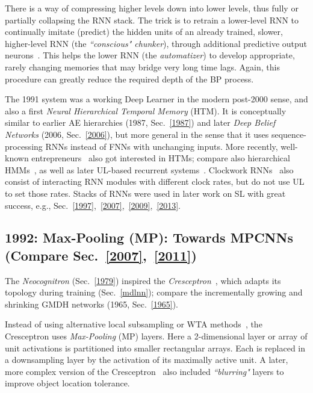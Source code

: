 \documentclass[letterpaper]{article}
\begin{document}
\begin{CJK*}{UTF8}{gbsn}
\begin{sloppypar}
There is a way of compressing higher levels down into lower levels, thus 
fully or partially collapsing the RNN stack. The trick is to retrain a lower-level RNN to continually imitate (predict) the hidden units of an already trained, slower, higher-level RNN (the {\em``conscious" chunker}), through additional predictive output neurons~\citep{chunker91and92}. This helps the lower RNN (the {\em automatizer}) to develop appropriate, rarely changing memories that may bridge very long time lags. Again, this procedure can greatly reduce the required depth of the BP process. 

The 1991 system was a working Deep Learner in the 
modern post-2000 sense, and also a first  {\em Neural Hierarchical Temporal Memory} (HTM).
It is conceptually similar to earlier AE hierarchies (1987, Sec.~\ref{1987}) and
 later {\em Deep Belief Networks}  (2006, Sec.~\ref{2006}), but more general in the sense that it uses sequence-processing RNNs instead of FNNs with unchanging inputs. 
More recently, well-known entrepreneurs~\citep{hawkins2006,kurzweil2012} also got interested in 
HTMs; compare also hierarchical HMMs~\citep[e.g.,][]{tishby1998},
as well as later UL-based recurrent 
systems~\citep{Klapper:01,steil2007,maass2013,young2014}.
Clockwork RNNs~\citep{icml2014} also consist 
of interacting RNN modules with different clock rates,
but do not use UL to set those rates. 
Stacks of RNNs were used in later work on SL with great success, 
e.g., Sec.~\ref{1997},~\ref{2007},~\ref{2009},~\ref{2013}.





\subsection{1992: Max-Pooling (MP): Towards MPCNNs (Compare Sec.~\ref{2007},~\ref{2011})}
\label{1999}

The {\em Neocognitron} (Sec.~\ref{1979}) inspired the
{\em Cresceptron}~\citep{weng1992}, which adapts its topology during training (Sec.~\ref{mdlnn});
compare the incrementally growing and shrinking 
 GMDH networks (1965, Sec.~\ref{1965}).

Instead of using alternative local subsampling or WTA 
methods~\citep[e.g.,][]{fukushima:1980,Schmidhuber:89cs,Maass2000,Fukushima:2013},
the Cresceptron uses {\em Max-Pooling} (MP) layers. Here 
a 2-dimensional layer or array of unit activations is partitioned into 
smaller rectangular arrays. Each is replaced in a downsampling layer by the activation of its maximally active unit.
A later, more complex version of the Cresceptron~\citep{weng1997} also included {\em ``blurring"} layers
to improve object location tolerance. 



\end{sloppypar}
\end{CJK*}
\end{document}
